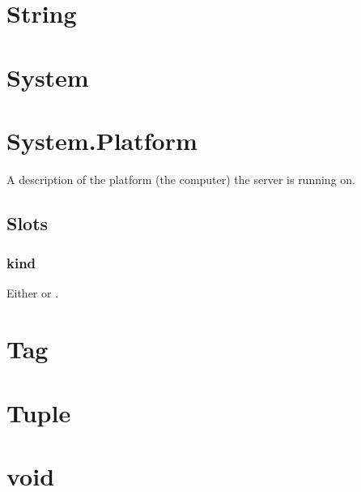 \section{String}

\section{System}

\section{System.Platform}

A description of the platform (the computer) the server is running on.
\subsection{Slots}

\subsubsection{kind}
Either  or .

\section{Tag}
\section{Tuple}
\section{void}


\let\section\sectionOrig
